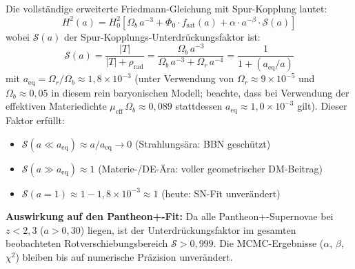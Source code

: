 \documentclass[aps,prd,twocolumn,superscriptaddress,nofootinbib]{revtex4-2}
\begin{document}
Die vollst\"andige erweiterte Friedmann-Gleichung mit Spur-Kopplung lautet:
\begin{equation}
{H^2(a) = H_0^2 \left[\Omega_b\,a^{-3} + \Phi_0 \cdot f_{\mathrm{sat}}(a) + \alpha \cdot a^{-\beta} \cdot \mathcal{S}(a)\right]}
\label{eq:extended_cfm_trace}
\end{equation}
wobei $\mathcal{S}(a)$ der Spur-Kopplungs-Unterdr\"uckungsfaktor ist:
\begin{equation}
\mathcal{S}(a) = \frac{|T|}{|T| + \rho_{\mathrm{rad}}} = \frac{\Omega_b\,a^{-3}}{\Omega_b\,a^{-3} + \Omega_r\,a^{-4}}
= \frac{1}{1 + (a_{\mathrm{eq}}/a)}
\label{eq:suppression}
\end{equation}
mit $a_{\mathrm{eq}} = \Omega_r/\Omega_b \approx 1{,}8 \times 10^{-3}$ (unter Verwendung von $\Omega_r \approx 9 \times 10^{-5}$ und $\Omega_b \approx 0{,}05$ in diesem rein baryonischen Modell; beachte, dass bei Verwendung der effektiven Materiedichte $\mu_{\mathrm{eff}}\,\Omega_b \approx 0{,}089$ stattdessen $a_{\mathrm{eq}} \approx 1{,}0 \times 10^{-3}$ gilt). Dieser Faktor erf\"ullt:
\begin{itemize}
\item $\mathcal{S}(a \ll a_{\mathrm{eq}}) \approx a/a_{\mathrm{eq}} \to 0$ \quad (Strahlungs\"ara: BBN gesch\"utzt)
\item $\mathcal{S}(a \gg a_{\mathrm{eq}}) \approx 1$ \quad (Materie-/DE-\"Ara: voller geometrischer DM-Beitrag)
\item $\mathcal{S}(a = 1) \approx 1 - 1{,}8\times10^{-3} \approx 1$ \quad (heute: SN-Fit unver\"andert)
\end{itemize}

\textbf{Auswirkung auf den Pantheon+-Fit:} Da alle Pantheon+-Supernovae bei $z < 2{,}3$ ($a > 0{,}30$) liegen, ist der Unterdr\"uckungsfaktor im gesamten beobachteten Rotverschiebungsbereich $\mathcal{S} > 0{,}999$. Die MCMC-Ergebnisse ($\alpha$, $\beta$, $\chi^2$) bleiben bis auf numerische Pr\"azision unver\"andert.
\end{document}
